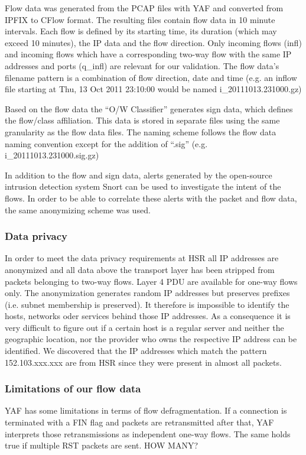 \documentclass[a4paper]{scrartcl}
\begin{document}
Flow  data was generated from the PCAP files with YAF \cite{yaf} and converted from IPFIX to CFlow format. The resulting files contain flow data in 10 minute intervals. Each flow is defined by its starting time, its duration (which may exceed 10 minutes), the IP data and the flow direction. Only incoming flows (infl) and incoming flows which have a corresponding two-way flow with the same IP addresses and ports (q\_infl) are relevant for our validation. The flow data's filename pattern is a combination of flow direction, date and time (e.g. an inflow file starting at Thu, 13 Oct 2011 23:10:00 would be named i\_20111013.231000.gz) 

Based on the flow data the ``O/W Classifier'' generates sign data, which defines the flow/class affiliation. This data is stored in separate files using the same granularity as the flow data files. The naming scheme follows the flow data naming convention except for the addition of ``.sig'' (e.g. i\_20111013.231000.sig.gz)

In addition to the flow and sign data, alerts generated by the open-source intrusion detection system Snort can be used to investigate the intent of the flows. In order to be able to correlate these alerts with the packet and flow data, the same anonymizing scheme was used.

\subsubsection{Data privacy}
In order to meet the data privacy requirements at HSR all IP addresses are anonymized and all data above the transport layer has been stripped from packets belonging to two-way flows. Layer 4 PDU are available for one-way flows only. The anonymization generates random IP addresses but preserves prefixes (i.e. subnet membership is preserved). It therefore is impossible to identify the hosts, networks oder services behind those IP addresses. As a consequence it is very difficult to figure out if a certain host is a regular server and neither the geographic location, nor the provider who owns the respective IP address can be identified. We discovered that the IP addresses which match the pattern 152.103.xxx.xxx are from HSR since they were present in almost all packets.

\subsubsection{Limitations of our flow data}
YAF has some limitations in terms of flow defragmentation. If a connection is terminated with a FIN flag and packets are retransmitted after that, YAF interprets those retransmissions as independent one-way flows. The same holds true if multiple RST packets are sent. HOW MANY?
\end{document}

